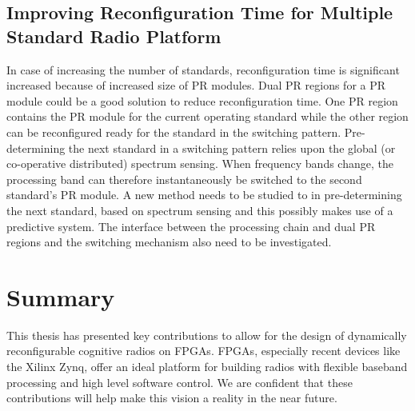 \subsection{Improving Reconfiguration Time for Multiple Standard Radio Platform}
In case of increasing the number of standards, reconfiguration time is significant increased because of increased size of PR modules.
Dual PR regions for a PR module could be a good solution to reduce reconfiguration time.
One PR region contains the PR module for the current operating standard while the other region can be reconfigured ready for the standard in the switching pattern.
Pre-determining the next standard in a switching pattern relies upon the global (or co-operative distributed) spectrum sensing.
When frequency bands change, the processing band can therefore instantaneously be switched to the second standard's PR module.
A new method needs to be studied to in pre-determining the next standard, based on spectrum sensing and this possibly makes use of a predictive system.
The interface between the processing chain and dual PR regions and the switching mechanism also need to be investigated.

\section{Summary}

This thesis has presented key contributions to allow for the design of dynamically reconfigurable cognitive radios on FPGAs. FPGAs, especially recent devices like the Xilinx Zynq, offer an ideal platform for building radios with flexible baseband processing and high level software control. We are confident that these contributions will help make this vision a reality in the near future.
